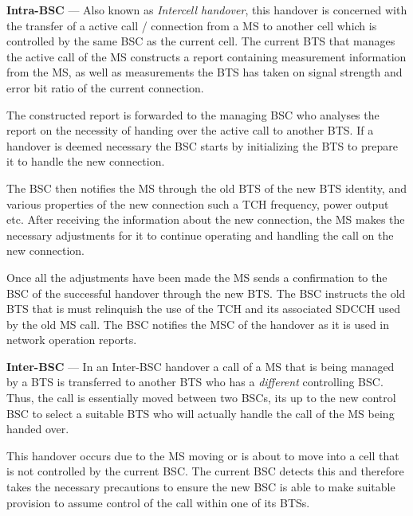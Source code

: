 \begin{description}
\item{\textbf{Intra-BSC}} --- Also known as \emph{Intercell handover}, this handover is concerned with the transfer of a active call / connection from a MS to another cell which is controlled by the same BSC as the current cell. The current BTS that manages the active call of the MS constructs a report containing measurement information from the MS, as well as measurements the BTS has taken on signal strength and error bit ratio of the current connection\cite{wirelesstelcoMullet,GSMArchitectureProtocolsServices}. 

The constructed report is forwarded to the managing BSC who analyses the report on the necessity of handing over the active call to another BTS. If a handover is deemed necessary the BSC starts by initializing the BTS to prepare it to handle the new connection\cite{wirelesstelcoMullet,GSMArchitectureProtocolsServices}.

The BSC then notifies the MS through the old BTS of the new BTS identity, and various properties of the new connection such a TCH frequency, power output etc. After receiving the information about the new connection, the MS makes the necessary adjustments for it to continue operating and handling the call on the new connection\cite{wirelesstelcoMullet,GSMArchitectureProtocolsServices}. 

Once all the adjustments have been made the MS sends a confirmation to the BSC of the successful handover through the new BTS. The BSC instructs the old BTS that is must relinquish the use of the TCH and its associated SDCCH used by the old MS call. The BSC notifies the MSC of the handover as it is used in network operation reports\cite{wirelesstelcoMullet,GSMArchitectureProtocolsServices}.
\item{\textbf{Inter-BSC}} --- In an Inter-BSC handover a call of a MS that is being managed by a BTS is transferred to another BTS who has a \emph{different} controlling BSC. Thus, the call is essentially moved between two BSCs, its up to the new control BSC to select a suitable BTS who will actually handle the call of the MS being handed over\cite{wirelesstelcoMullet,GSMArchitectureProtocolsServices}.

This handover occurs due to the MS moving or is about to move into a cell that is not controlled by the current BSC. The current BSC detects this and therefore takes the necessary precautions to ensure the new BSC is able to make suitable provision to assume control of the call within one of its BTSs\cite{wirelesstelcoMullet,GSMArchitectureProtocolsServices}.


\end{description}
